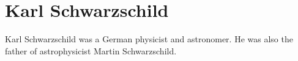 

\section{Karl Schwarzschild}

Karl Schwarzschild was a German physicist and astronomer. He was also the father of astrophysicist Martin Schwarzschild.


